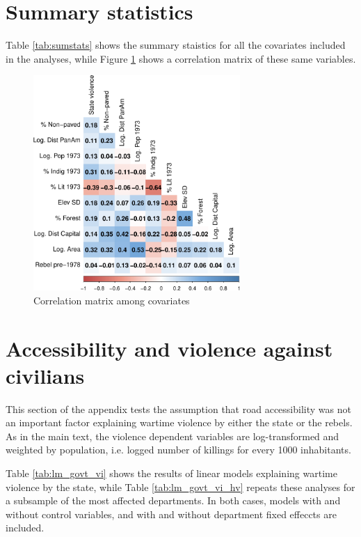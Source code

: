 \documentclass[a4paper, 12pt, notitlepage]{article}
\begin{document}
\clearpage
\section{Summary statistics}\label{app:stats}

Table \ref{tab:sumstats} shows the summary staistics for all the covariates included in the analyses, while Figure \ref{fig:corrplot} shows a correlation matrix of these same variables.



\begin{figure}[htb!]
  \centering
    \includegraphics[width = 0.7\textwidth]{img/corrplot}

  \caption{Correlation matrix among covariates} \label{fig:corrplot}

\end{figure}

\clearpage
\section{Accessibility and violence against civilians}\label{app:lm_violence}

This section of the appendix tests the assumption that road accessibility was not an important factor explaining wartime violence by either the state or the rebels.
As in the main text, the violence dependent variables are log-transformed and weighted by population, i.e. logged number of killings for every 1000 inhabitants.

Table \ref{tab:lm_govt_vi} shows the results of linear models explaining wartime violence by the state, while Table \ref{tab:lm_govt_vi_hv} repeats these analyses for a subsample of the most affected departments.
In both cases, models with and without control variables, and with and without department fixed effeccts are included.
\end{document}
